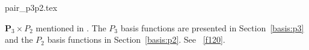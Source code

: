 \begin{flushright} {\tiny {\color{gray} pair\_p3p2.tex}} \end{flushright}

${\bm P}_3\times P_2$ mentioned in \textcite{sten90}.
The $P_3$ basis functions are presented in Section~\ref{basis:p3} and the $P_2$ basis
functions in Section~\ref{basis:p2}.
See \stone~\ref{f120}.
